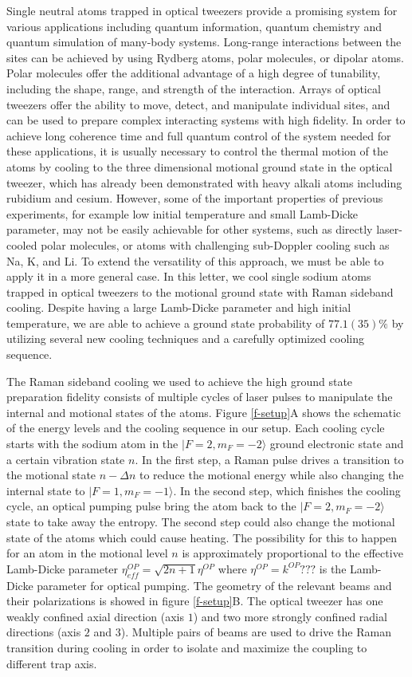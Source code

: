 \documentclass[aps,prl,twocolumn,groupedaddress]{revtex4-1}
\begin{document}
Single neutral atoms trapped in optical tweezers provide a promising system
for various applications including quantum information, quantum chemistry
and quantum simulation of many-body systems.
Long-range interactions between the sites can be achieved by using Rydberg atoms,
polar molecules, or dipolar atoms.
Polar molecules offer the additional advantage of a high degree of tunability,
including the shape, range, and strength of the interaction.
Arrays of optical tweezers offer the ability to move, detect, and manipulate individual sites,
and can be used to prepare complex interacting systems with high fidelity.
In order to achieve long coherence time and full quantum control of the system needed for
these applications,
it is usually necessary to control the thermal motion of the atoms by cooling to the
three dimensional motional ground state in the optical tweezer,
which has already been demonstrated with heavy alkali atoms including rubidium and cesium.
However, some of the important properties of previous experiments,
for example low initial temperature and small Lamb-Dicke parameter,
may not be easily achievable for other systems, such as directly laser-cooled polar molecules,
or atoms with challenging sub-Doppler cooling such as Na, K, and Li.
To extend the versatility of this approach, we must be able to apply it in a more general case.
In this letter, we cool single sodium atoms
trapped in optical tweezers to the motional ground state with Raman sideband cooling.
Despite having a large Lamb-Dicke parameter and high initial temperature, we are able to achieve a ground state probability of $77.1(35)\%$
by utilizing several new cooling techniques and a carefully optimized cooling sequence.

The Raman sideband cooling we used to achieve the high ground state preparation fidelity
consists of multiple cycles of laser pulses to manipulate the internal and
motional states of the atoms.
Figure \ref{f-setup}A shows the schematic of the energy levels and the cooling sequence
in our setup.
Each cooling cycle starts with the sodium atom in the $|F=2, m_F=-2\rangle$
ground electronic state and a certain vibration state $n$.
In the first step, a Raman pulse drives a transition to the motional state $n-\Delta n$
to reduce the motional energy while also changing the internal state to $|F=1, m_F=-1\rangle$.
In the second step, which finishes the cooling cycle,
an optical pumping pulse bring the atom back to the $|F=2, m_F=-2\rangle$ state to take away
the entropy. The second step could also change the motional state of the atoms which
could cause heating. The possibility for this to happen for an atom in the motional level $n$
is approximately proportional to the effective Lamb-Dicke parameter
$\eta^{OP}_{eff}=\sqrt{2n+1}\eta^{OP}$ where $\eta^{OP}=k^{OP}???$ is the Lamb-Dicke parameter for
optical pumping.
The geometry of the relevant beams and their polarizations is showed in figure \ref{f-setup}B.
The optical tweezer has one weakly confined axial direction (axis $1$) and
two more strongly confined radial directions (axis $2$ and $3$).
Multiple pairs of beams are used to drive the Raman transition during cooling in order to
isolate and maximize the coupling to different trap axis.
\end{document}
